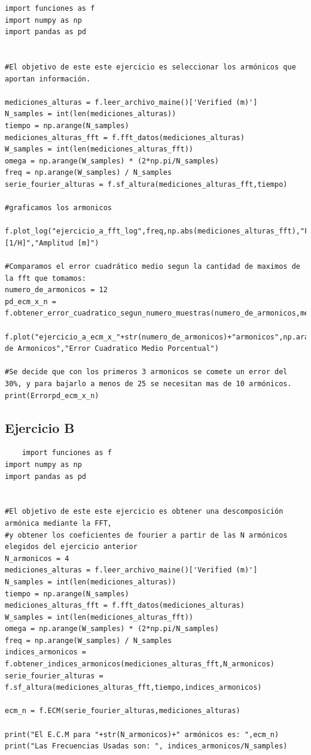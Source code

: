 \documentclass[10pt,a4paper]{article}
\numberwithin{equation}{section}
\numberwithin{figure}{section}
\numberwithin{table}{section}
\begin{document}
\begin{verbatim}
import funciones as f
import numpy as np
import pandas as pd


#El objetivo de este este ejercicio es seleccionar los armónicos que aportan información.

mediciones_alturas = f.leer_archivo_maine()['Verified (m)']
N_samples = int(len(mediciones_alturas))
tiempo = np.arange(N_samples)
mediciones_alturas_fft = f.fft_datos(mediciones_alturas)
W_samples = int(len(mediciones_alturas_fft))
omega = np.arange(W_samples) * (2*np.pi/N_samples)
freq = np.arange(W_samples) / N_samples
serie_fourier_alturas = f.sf_altura(mediciones_alturas_fft,tiempo)

#graficamos los armonicos

f.plot_log("ejercicio_a_fft_log",freq,np.abs(mediciones_alturas_fft),"Frecuencia [1/H]","Amplitud [m]")

#Comparamos el error cuadrático medio segun la cantidad de maximos de la fft que tomamos:
numero_de_armonicos = 12
pd_ecm_x_n = f.obtener_error_cuadratico_segun_numero_muestras(numero_de_armonicos,mediciones_alturas,mediciones_alturas_fft,'ecm_por_'+str(numero_de_armonicos)+'_armonicos.csv')

f.plot("ejercicio_a_ecm_x_"+str(numero_de_armonicos)+"armonicos",np.arange(len(pd_ecm_x_n["ECM%"])),pd_ecm_x_n["ECM%"],"Numero de Armonicos","Error Cuadratico Medio Porcentual")

#Se decide que con los primeros 3 armonicos se comete un error del 30%, y para bajarlo a menos de 25 se necesitan mas de 10 armónicos. 
print(Errorpd_ecm_x_n)
\end{verbatim}
\subsection{Ejercicio B}
\begin{verbatim}
    import funciones as f
import numpy as np
import pandas as pd


#El objetivo de este este ejercicio es obtener una descomposición armónica mediante la FFT, 
#y obtener los coeficientes de fourier a partir de las N armónicos elegidos del ejercicio anterior
N_armonicos = 4
mediciones_alturas = f.leer_archivo_maine()['Verified (m)']
N_samples = int(len(mediciones_alturas))
tiempo = np.arange(N_samples)
mediciones_alturas_fft = f.fft_datos(mediciones_alturas)
W_samples = int(len(mediciones_alturas_fft))
omega = np.arange(W_samples) * (2*np.pi/N_samples)
freq = np.arange(W_samples) / N_samples
indices_armonicos = f.obtener_indices_armonicos(mediciones_alturas_fft,N_armonicos)
serie_fourier_alturas = f.sf_altura(mediciones_alturas_fft,tiempo,indices_armonicos)

ecm_n = f.ECM(serie_fourier_alturas,mediciones_alturas)

print("El E.C.M para "+str(N_armonicos)+" armónicos es: ",ecm_n)
print("Las Frecuencias Usadas son: ", indices_armonicos/N_samples)

\end{verbatim}
\end{document}
